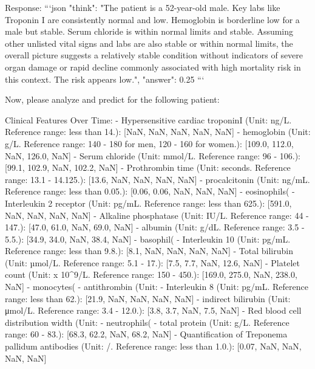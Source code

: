 \begin{tcolorbox}[colback=cadmiumgreen!5!white,colframe=forestgreen!75!white,breakable,title=\textit{Optimized-setting with in-context learning prompt template for the mortality prediction task on the TJH.}]
\begin{VerbatimWrap}
Response:
```json { "think": "The patient is a 52-year-old male. Key labs like Troponin I are consistently normal and low. Hemoglobin is borderline low for a male but stable. Serum chloride is within normal limits and stable. Assuming other unlisted vital signs and labs are also stable or within normal limits, the overall picture suggests a relatively stable condition without indicators of severe organ damage or rapid decline commonly associated with high mortality risk in this context. The risk appears low.", "answer": 0.25 } ```

Now, please analyze and predict for the following patient:

Clinical Features Over Time:
- Hypersensitive cardiac troponinI (Unit: ng/L. Reference range: less than 14.): [NaN, NaN, NaN, NaN, NaN]
- hemoglobin (Unit: g/L. Reference range: 140 - 180 for men, 120 - 160 for women.): [109.0, 112.0, NaN, 126.0, NaN]
- Serum chloride (Unit: mmol/L. Reference range: 96 - 106.): [99.1, 102.9, NaN, 102.2, NaN]
- Prothrombin time (Unit: seconds. Reference range: 13.1 - 14.125.): [13.6, NaN, NaN, NaN, NaN]
- procalcitonin (Unit: ng/mL. Reference range: less than 0.05.): [0.06, 0.06, NaN, NaN, NaN]
- eosinophils(%
- Interleukin 2 receptor (Unit: pg/mL. Reference range: less than 625.): [591.0, NaN, NaN, NaN, NaN]
- Alkaline phosphatase (Unit: IU/L. Reference range: 44 - 147.): [47.0, 61.0, NaN, 69.0, NaN]
- albumin (Unit: g/dL. Reference range: 3.5 - 5.5.): [34.9, 34.0, NaN, 38.4, NaN]
- basophil(%
- Interleukin 10 (Unit: pg/mL. Reference range: less than 9.8.): [8.1, NaN, NaN, NaN, NaN]
- Total bilirubin (Unit: µmol/L. Reference range: 5.1 - 17.): [7.5, 7.7, NaN, 12.6, NaN]
- Platelet count (Unit: x 10^9/L. Reference range: 150 - 450.): [169.0, 275.0, NaN, 238.0, NaN]
- monocytes(%
- antithrombin (Unit: %
- Interleukin 8 (Unit: pg/mL. Reference range: less than 62.): [21.9, NaN, NaN, NaN, NaN]
- indirect bilirubin (Unit: μmol/L. Reference range: 3.4 - 12.0.): [3.8, 3.7, NaN, 7.5, NaN]
- Red blood cell distribution width (Unit: %
- neutrophils(%
- total protein (Unit: g/L. Reference range: 60 - 83.): [68.3, 62.2, NaN, 68.2, NaN]
- Quantification of Treponema pallidum antibodies (Unit: /. Reference range: less than 1.0.): [0.07, NaN, NaN, NaN, NaN]

\end{VerbatimWrap}
\end{tcolorbox}
